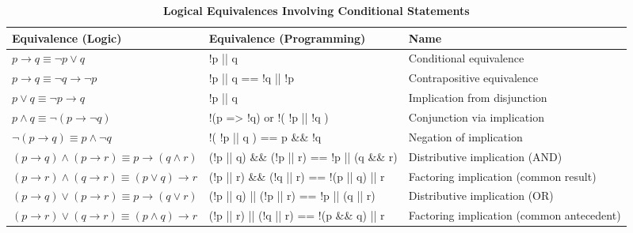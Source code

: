 \newpage
\begin{table}[h!]
\centering
\renewcommand{\arraystretch}{1.3} %
\caption*{\textbf{Logical Equivalences Involving Conditional Statements}}
\begin{tabular}{|
    >{\centering\arraybackslash}m{5cm}
    |>{\centering\arraybackslash}m{7cm}
    |>{\centering\arraybackslash}m{4cm}|}
\hline
\rowcolor{gray!20}
\textbf{Equivalence (Logic)} & \textbf{Equivalence (Programming)} &\textbf{Name} \\
\hline
$p \rightarrow q \equiv \neg p \lor q$ & !p || q & Conditional equivalence \\
\hline
$p \rightarrow q \equiv \neg q \rightarrow \neg p$ & !p || q == !q || !p & Contrapositive equivalence \\
\hline
$p \lor q \equiv \neg p \rightarrow q$ & !p || q & Implication from disjunction \\
\hline
$p \land q \equiv \neg(p \rightarrow \neg q)$ & !(p => !q) or !( !p || !q ) & Conjunction via implication \\
\hline
$\neg (p \rightarrow q) \equiv p \land \neg q$ & !( !p || q ) == p \&\& !q & Negation of implication \\
\hline
$(p\rightarrow q) \land (p \rightarrow r) \equiv p \rightarrow (q \land r)$ & (!p || q) \&\& (!p || r) == !p || (q \&\& r) & Distributive implication (AND) \\
\hline
$(p\rightarrow r) \land (q \rightarrow r) \equiv (p \lor q) \rightarrow r$ & (!p || r) \&\& (!q || r) == !(p || q) || r & Factoring implication (common result) \\
\hline
$(p\rightarrow q) \lor (p \rightarrow r) \equiv p \rightarrow (q \lor r)$ & (!p || q) || (!p || r) == !p || (q || r) & Distributive implication (OR) \\
\hline
$(p\rightarrow r) \lor (q \rightarrow r) \equiv (p \land q) \rightarrow r$ & (!p || r) || (!q || r) == !(p \&\& q) || r & Factoring implication (common antecedent) \\
\hline
\end{tabular}
\end{table}

